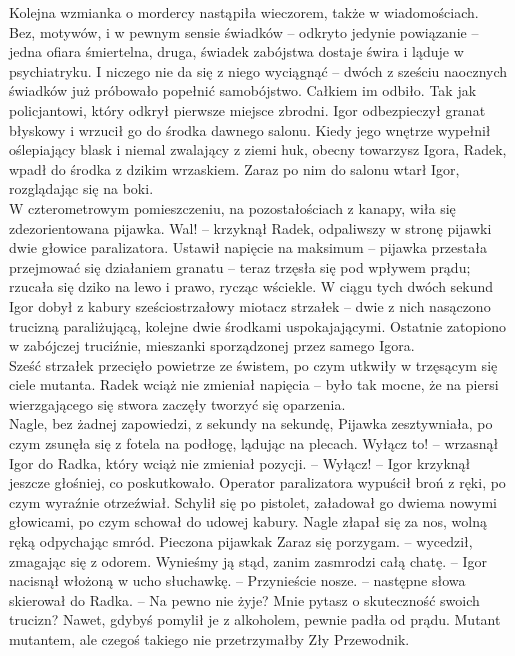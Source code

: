 \documentclass[../MAIN.tex]{subfiles}
\begin{document}
Kolejna wzmianka o mordercy nastąpiła wieczorem, także w wiadomościach.\\
Bez, motywów, i w pewnym sensie świadków -- odkryto jedynie powiązanie -- jedna ofiara śmiertelna, druga, świadek zabójstwa dostaje świra i ląduje w psychiatryku. I niczego nie da się z niego wyciągnąć -- dwóch z sześciu naocznych świadków już próbowało popełnić samobójstwo. Całkiem im odbiło. Tak jak policjantowi, który odkrył pierwsze miejsce zbrodni.
% 
% 
% 
% 
Igor odbezpieczył granat błyskowy i wrzucił go do środka dawnego salonu. Kiedy jego wnętrze wypełnił oślepiający blask i niemal zwalający z ziemi huk, obecny towarzysz Igora, Radek, wpadł do środka z dzikim wrzaskiem. Zaraz po nim do salonu wtarł Igor, rozglądając się na boki.\\
W czterometrowym pomieszczeniu, na pozostałościach z kanapy, wiła się zdezorientowana pijawka.
\sx Wal! -- krzyknął Radek, odpaliwszy w stronę pijawki dwie głowice paralizatora.
\qd
Ustawił napięcie na maksimum -- pijawka przestała przejmować się działaniem granatu -- teraz trzęsła się pod wpływem prądu; rzucała się dziko na lewo i prawo, rycząc wściekle. W ciągu tych dwóch sekund Igor dobył z kabury sześciostrzałowy miotacz strzałek -- dwie z nich nasączono trucizną paraliżującą, kolejne dwie środkami uspokajającymi. Ostatnie zatopiono w zabójczej truciźnie, mieszanki sporządzonej przez samego Igora.\\
Sześć strzałek przecięło powietrze ze świstem, po czym utkwiły w trzęsącym się ciele mutanta.
Radek wciąż nie zmieniał napięcia -- było tak mocne, że na piersi wierzgającego się stwora zaczęły tworzyć się oparzenia.\\
Nagle, bez żadnej zapowiedzi, z sekundy na sekundę, Pijawka zesztywniała, po czym zsunęła się z fotela na podłogę, lądując na plecach.
\sx Wyłącz to! -- wrzasnął Igor do Radka, który wciąż nie zmieniał pozycji. -- Wyłącz! -- Igor krzyknął jeszcze głośniej, co poskutkowało. 
\qd
Operator paralizatora wypuścił broń z ręki, po czym wyraźnie otrzeźwiał. Schylił się po pistolet, załadował go dwiema nowymi głowicami, po czym schował do udowej kabury. Nagle złapał się za nos, wolną ręką odpychając smród.
\sx Pieczona pijawka\3k Zaraz się porzygam. -- wycedził, zmagając się z odorem.
\xx Wynieśmy ją stąd, zanim zasmrodzi całą chatę. -- Igor nacisnął włożoną w ucho słuchawkę. -- Przynieście nosze. -- następne słowa skierował do Radka. -- Na pewno nie żyje?
\xx Mnie pytasz o skuteczność swoich trucizn? Nawet, gdybyś pomylił je z alkoholem, pewnie padła od prądu. Mutant mutantem, ale czegoś takiego nie przetrzymałby Zły Przewodnik.
\end{document}
